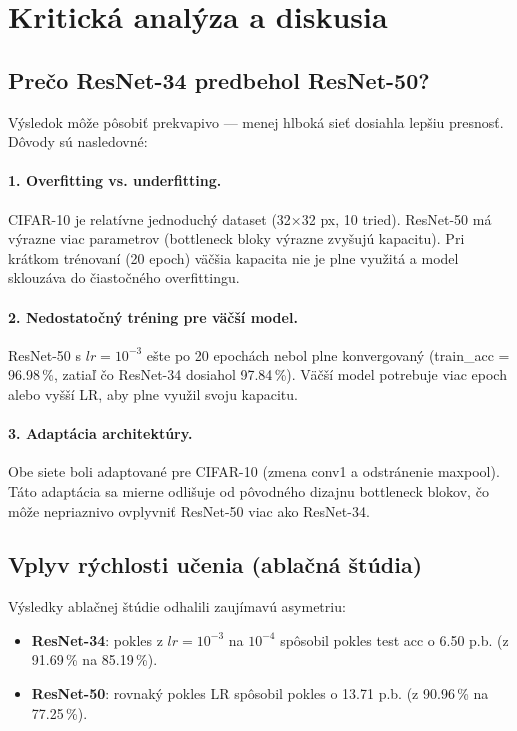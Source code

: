 \documentclass[12pt,a4paper]{article}
\begin{document}
\section{Kritická analýza a diskusia}

\subsection{Prečo ResNet-34 predbehol ResNet-50?}

Výsledok môže pôsobiť prekvapivo — menej hlboká sieť dosiahla lepšiu presnosť.
Dôvody sú nasledovné:

\paragraph{1. Overfitting vs. underfitting.}
CIFAR-10 je relatívne jednoduchý dataset (32×32 px, 10 tried). ResNet-50 má
výrazne viac parametrov (bottleneck bloky výrazne zvyšujú kapacitu).
Pri krátkom trénovaní (20 epoch) väčšia kapacita nie je plne využitá
a model sklouzáva do čiastočného overfittingu.

\paragraph{2. Nedostatočný tréning pre väčší model.}
ResNet-50 s $lr = 10^{-3}$ ešte po 20 epochách nebol plne konvergovaný
(train\_acc = 96.98\,\%, zatiaľ čo ResNet-34 dosiahol 97.84\,\%).
Väčší model potrebuje viac epoch alebo vyšší LR, aby plne využil svoju kapacitu.

\paragraph{3. Adaptácia architektúry.}
Obe siete boli adaptované pre CIFAR-10 (zmena conv1 a odstránenie maxpool).
Táto adaptácia sa mierne odlišuje od pôvodného dizajnu bottleneck blokov,
čo môže nepriaznivo ovplyvniť ResNet-50 viac ako ResNet-34.

\subsection{Vplyv rýchlosti učenia (ablačná štúdia)}

Výsledky ablačnej štúdie odhalili zaujímavú asymetriu:

\begin{itemize}
  \item \textbf{ResNet-34}: pokles z $lr = 10^{-3}$ na $10^{-4}$ spôsobil pokles test acc
        o 6.50 p.b. (z 91.69\,\% na 85.19\,\%).
  \item \textbf{ResNet-50}: rovnaký pokles LR spôsobil pokles o 13.71 p.b.
        (z 90.96\,\% na 77.25\,\%).
\end{itemize}
\end{document}
